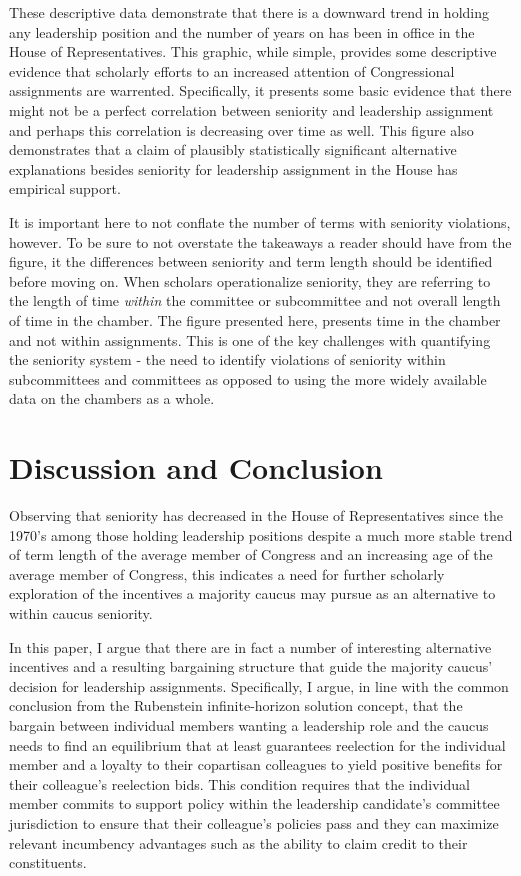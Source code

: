 \documentclass [12pt]{article}
\begin{document}
{{These descriptive data demonstrate that there is a downward trend in holding any leadership position and the number of years on has been in office in the House of Representatives. This graphic, while simple, provides some descriptive evidence that scholarly efforts to an increased attention of Congressional assignments are warrented. Specifically, it presents some basic evidence that there might not be a perfect correlation between seniority and leadership assignment and perhaps this correlation is decreasing over time as well. This figure also demonstrates that a claim of plausibly statistically significant alternative explanations besides seniority for leadership assignment in the House has empirical support. 

It is important here to not conflate the number of terms with seniority violations, however. To be sure to not overstate the takeaways a reader should have from the figure, it the differences between seniority and term length should be identified before moving on. When scholars operationalize seniority, they are referring to the length of time \textit{within} the committee or subcommittee and not overall length of time in the chamber. The figure presented here, presents time in the chamber and not within assignments. This is one of the key challenges with quantifying the seniority system - the need to identify violations of seniority within subcommittees and committees as opposed to using the more widely available data on the chambers as a whole. 

\section*{Discussion and Conclusion}

Observing that seniority has decreased in the House of Representatives since the 1970's among those holding leadership positions despite a much more stable trend of term length of the average member of Congress and an increasing age of the average member of Congress, this indicates a need for further scholarly exploration of the incentives a majority caucus may pursue as an alternative to within caucus seniority. 

In this paper, I argue that there are in fact a number of interesting alternative incentives and a resulting bargaining structure that guide the majority caucus' decision for leadership assignments. Specifically, I argue, in line with the common conclusion from the Rubenstein infinite-horizon solution concept, that the bargain between individual members wanting a leadership role and the caucus needs to find an equilibrium that at least guarantees reelection for the individual member and a loyalty to their copartisan colleagues to yield positive benefits for their colleague's reelection bids. This condition requires that the individual member commits to support policy within the leadership candidate's committee jurisdiction to ensure that their colleague's policies pass and they can maximize relevant incumbency advantages such as the ability to claim credit to their constituents.

}}
\end{document}
